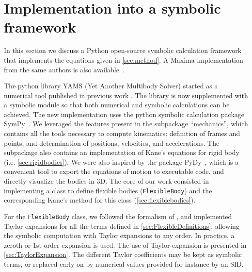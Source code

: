 \documentclass[wes, manuscript]{copernicus}
\begin{document}
\section{Implementation into a symbolic framework}
\label{sec:implementation}
In this section we discuss a Python open-source symbolic calculation framework that implements the equations given in \autoref{sec:method}. 
A Maxima implementation from the same authors is also available~\cite{CADynTurb}.

The python library YAMS (Yet Another Multibody Solver) started as a numerical tool published in previous work \citep{branlard:2019flex}.
The library is now supplemented with a symbolic module so that both numerical and symbolic calculations can be achieved.
The new implementation uses the python symbolic calculation package SymPy~\citep{sympy}. We leveraged the features present in the subpackage ``mechanics'', which contains all the tools necessary to compute kinematics: definition of frames and points, and determination of positions, velocities, and accelerations. The subpackage also contains an implementation of Kane's equations for rigid body (i.e. \autoref{sec:rigidbodies}). We were also inspired by the package PyDy~\citep{Gede:2013}, which is a convenient tool to export the equations of motion to executable code, and directly visualize the bodies in 3D. The core of our work consisted in implementing a class to define flexible bodies (\texttt{FlexibleBody}) and the corresponding Kane's method for this class (\autoref{sec:flexiblebodies}).  

For the \texttt{FlexibleBody} class, we followed the formalism of \cite{Wallrapp:1994}, and implemented Taylor expansions for all the terms defined in \autoref{sec:FlexibleDefinitions}, allowing the symbolic computation with Taylor expansions to any order. In practice, a zeroth or 1st order expansion is used. The use of Taylor expansion is presented in \autoref{sec:TaylorExpansion}. 
The different Taylor coefficients may be kept as symbolic terms, or replaced early on by numerical values provided for instance by an SID. 
\end{document}
